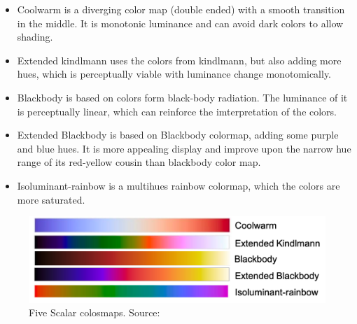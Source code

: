 \documentclass[a4paper, 12pt]{report}
\begin{document}
\begin{itemize}
	\item Coolwarm is a diverging color map (double ended) with a smooth transition in the middle. It is monotonic luminance and can avoid dark colors to allow shading. 

	\item Extended kindlmann uses the colors from kindlmann, but also adding more hues, which is perceptually viable with luminance change monotomically. 

	\item Blackbody is based on colors form black-body radiation. The luminance of it is perceptually linear, which can reinforce the imterpretation of the colors.

	\item Extended Blackbody is based on Blackbody colormap, adding some purple and blue hues. It is more appealing display and improve upon the narrow hue range of its red-yellow cousin than blackbody color map. 

	\item Isoluminant-rainbow is a multihues rainbow colormap, which the colors are more saturated.
\end{itemize}
\begin{figure}[ht]
    \centering
    \includegraphics[width = 0.8\columnwidth]{1}
    \caption{ Five Scalar colosmaps. Source:  \cite{???}}
    \label{fig:1}
\end{figure}	
\end{document}
